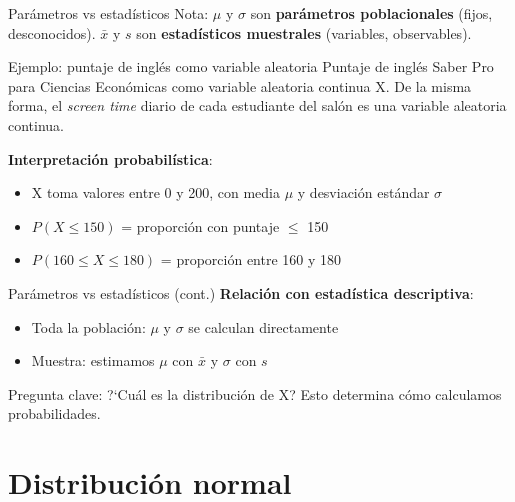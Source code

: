 \documentclass[aspectratio=169, 11pt]{beamer}
\begin{document}
\begin{frame}{Par\'ametros vs estad\'isticos}
\alert{Nota}: $\mu$ y $\sigma$ son \textbf{par\'ametros poblacionales} (fijos, desconocidos). $\bar{x}$ y $s$ son \textbf{estad\'isticos muestrales} (variables, observables).

\vspace{0.5em}
\begin{exampleblock}{Ejemplo: puntaje de ingl\'es como variable aleatoria}
Puntaje de ingl\'es Saber Pro para Ciencias Econ\'omicas como variable aleatoria continua X. De la misma forma, el \emph{screen time} diario de cada estudiante del sal\'on es una variable aleatoria continua.
\end{exampleblock}

\textbf{Interpretaci\'on probabil\'istica}:
\begin{itemize}
\item X toma valores entre 0 y 200, con media $\mu$ y desviaci\'on est\'andar $\sigma$
\item $P(X \leq 150)$ = proporci\'on con puntaje $\leq$ 150
\item $P(160 \leq X \leq 180)$ = proporci\'on entre 160 y 180
\end{itemize}
\end{frame}

\begin{frame}{Par\'ametros vs estad\'isticos (cont.)}
\textbf{Relaci\'on con estad\'istica descriptiva}:
\begin{itemize}
\item \alert{Toda la poblaci\'on}: $\mu$ y $\sigma$ se calculan directamente
\item \alert{Muestra}: estimamos $\mu$ con $\bar{x}$ y $\sigma$ con $s$
\end{itemize}

\alert{Pregunta clave}: ?`Cu\'al es la distribuci\'on de X? Esto determina c\'omo calculamos probabilidades.
\end{frame}


\section{Distribución normal}
\end{document}
